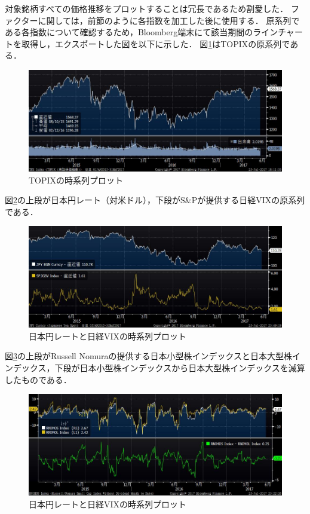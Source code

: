 \documentclass[11pt]{jreport}
\begin{document}
対象銘柄すべての価格推移をプロットすることは冗長であるため割愛した．
ファクターに関しては，前節のように各指数を加工した後に使用する．
原系列である各指数について確認するため，Bloomberg端末にて該当期間のラインチャートを取得し，エクスポートした図を以下に示した．
図\ref{fig:TOPIX}はTOPIXの原系列である．
\begin{figure}[H]
	\begin{center}
		\includegraphics[width=15cm]{./fig/TOPIX.jpg}
		\caption{TOPIXの時系列プロット}
		\label{fig:TOPIX}
	\end{center}
\end{figure}
図\ref{fig:VIX_JPY}の上段が日本円レート（対米ドル），下段がS\&Pが提供する日経VIXの原系列である．
\begin{figure}[H]
	\begin{center}
		\includegraphics[width=15cm]{./fig/VIX_JPY.jpg}
		\caption{日本円レートと日経VIXの時系列プロット}
		\label{fig:VIX_JPY}
	\end{center}
\end{figure}
図\ref{fig:Size}の上段がRussell Nomuraの提供する日本小型株インデックスと日本大型株インデックス，下段が日本小型株インデックスから日本大型株インデックスを減算したものである．
\begin{figure}[H]
	\begin{center}
		\includegraphics[width=15cm]{./fig/Size.jpg}
		\caption{日本円レートと日経VIXの時系列プロット}
		\label{fig:Size}
	\end{center}
\end{figure}
\end{document}
